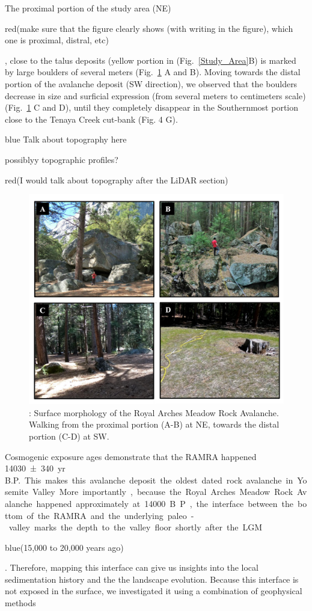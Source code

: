 \documentclass[5p]{elsarticle}
\newcommand{\COMON}{\begin{color}{blue}}
\newcommand{\COMOFF}{\end{color}}
\newcommand{\alon}{\begin{color}{red}}
\newcommand{\aloff}{\end{color}}
\begin{document}
The proximal portion of the study area (NE) \alon(make sure that the figure clearly shows (with writing in the figure), which one is proximal, distral, etc)\aloff, close to the talus deposits (yellow portion in (Fig.~\ref{Study_Area}B) is marked by large boulders of several meters (Fig.~\ref{Study_Area2} A and B). Moving towards the distal portion of the avalanche deposit (SW direction), we observed that the boulders decrease in size and surficial expression (from several meters to centimeters scale) (Fig.~\ref{Study_Area2} C and D), until they completely disappear in the Southernmost portion close to the Tenaya Creek cut-bank (Fig. 4 G).

\COMON
Talk about topography here

possiblyy topographic profiles?
\COMOFF

\alon (I would talk about topography after the LiDAR section) \aloff

									\begin{figure}[h]

	\includegraphics[width=\textwidth]{Figures/Study_Area2.pdf}
		\caption{: Surface morphology of the Royal Arches Meadow Rock Avalanche. Walking from the proximal portion (A-B) at NE, towards the distal portion (C-D) at SW. \label{Study_Area2}}

									\end{figure}


Cosmogenic  exposure ages demonstrate that the RAMRA happened \SI{14030 \pm 340}{yr\, B.P.}. This makes this avalanche deposit the oldest dated rock avalanche in Yosemite Valley. More importantly, because the Royal Arches Meadow Rock Avalanche happened approximately at 14000 B.P., the interface between the bottom of the RAMRA and the underlying paleo-valley marks the depth to the valley floor shortly after the LGM \COMON(15,000 to 20,000 years ago)\COMOFF. Therefore, mapping this interface can give us insights into the local sedimentation history and the the landscape evolution. Because this interface is not exposed in the surface, we investigated it using a combination of geophysical methods
\end{document}
